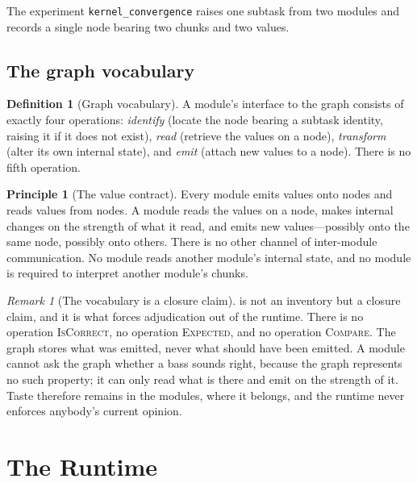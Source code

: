 \documentclass[11pt,twocolumn,a4paper]{article}
\theoremstyle{definition}
\newtheorem{definition}[theorem]{Definition}
\newtheorem{principle}[theorem]{Principle}
\theoremstyle{remark}
\newtheorem{remark}[theorem]{Remark}
\begin{document}
The experiment \texttt{kernel\_convergence} raises one subtask from two modules
and records a single node bearing two chunks and two values.

\subsection{The graph vocabulary}

\begin{definition}[Graph vocabulary]
\label{def:vocab}
A module's interface to the graph consists of exactly four operations:
\emph{identify} (locate the node bearing a subtask identity, raising it if it
does not exist), \emph{read} (retrieve the values on a node), \emph{transform}
(alter its own internal state), and \emph{emit} (attach new values to a node).
There is no fifth operation.
\end{definition}

\begin{principle}[The value contract]
\label{prin:contract}
Every module emits values onto nodes and reads values from nodes. A module reads
the values on a node, makes internal changes on the strength of what it read, and
emits new values---possibly onto the same node, possibly onto others. There is no
other channel of inter-module communication. No module reads another module's
internal state, and no module is required to interpret another module's chunks.
\end{principle}

\begin{remark}[The vocabulary is a closure claim]
\label{rem:closure}
 is not an inventory but a closure claim, and it is what forces
adjudication out of the runtime. There is no operation \textsc{IsCorrect}, no
operation \textsc{Expected}, and no operation \textsc{Compare}. The graph stores
what was emitted, never what should have been emitted. A module cannot ask the
graph whether a bass sounds right, because the graph represents no such property;
it can only read what is there and emit on the strength of it. Taste therefore
remains in the modules, where it belongs, and the runtime never enforces
anybody's current opinion.
\end{remark}

\section{The Runtime}
\label{sec:runtime}
\end{document}
